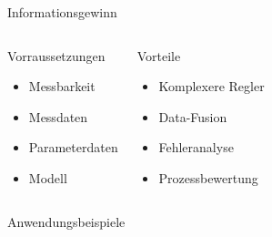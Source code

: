 \documentclass[fleqn,11pt,aspectratio=43]{beamer}
\begin{document}
\begin{frame}{Informationsgewinn}
\begin{columns}[onlytextwidth]
	\begin{alertblock}{Vorraussetzungen}
		\begin{itemize}
			\item Messbarkeit
			\item Messdaten
			\item Parameterdaten
			\item Modell
		\end{itemize}
	\end{alertblock}
	\begin{block}{Vorteile}
		\begin{itemize}
			\item Komplexere Regler
			\item Data-Fusion
			\item Fehleranalyse
			\item Prozessbewertung
		\end{itemize}
	\end{block}
  \end{columns}

\end{frame}

\begin{frame}{Anwendungsbeispiele}
\end{frame}
\end{document}
